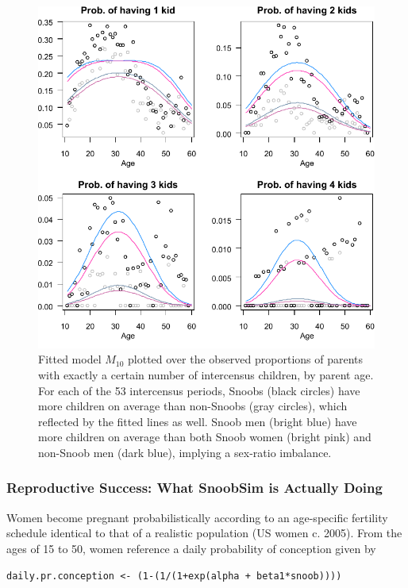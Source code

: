 \begin{figure}[t]
\begin{center}
\includegraphics[scale=1]{figures/rtdice/rs.pdf}
\caption{Fitted model $M_{10}$ plotted over the observed proportions of parents with exactly a certain number of intercensus children, by parent age.  For each of the 53 intercensus periods, Snoobs (black circles) have more children on average than non-Snoobs (gray circles), which reflected by the fitted lines as well.  Snoob men (bright blue) have more children on average than both Snoob women (bright pink) and non-Snoob men (dark blue), implying a sex-ratio imbalance.}
\label{fig:rs}
\end{center}
\end{figure}


\subsubsection{Reproductive Success: What SnoobSim is Actually Doing}

Women become pregnant probabilistically according to an age-specific fertility schedule identical to that of a realistic population (US women c. 2005).  From the ages of 15 to 50, women reference a daily probability of conception given by

\begin{verbatim}
daily.pr.conception <- (1-(1/(1+exp(alpha + beta1*snoob))))
\end{verbatim}

